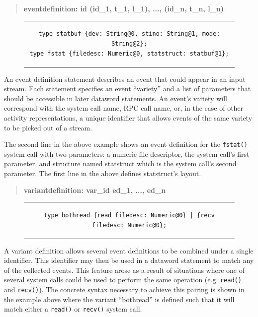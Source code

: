 \begin{quote}
\centering
\textbf{eventdefinition: id (id\_1, t\_1, l\_1), ..., (id\_n, t\_n, l\_n) }
\end{quote}

\begin{figure}[H]
\centering
\begin{tabular}{c}
\begin{lstlisting}
type statbuf {dev: String@0, stino: String@1, mode: String@2};
type fstat {filedesc: Numeric@0, statstruct: statbuf@1};
\end{lstlisting}
\end{tabular}
\end{figure}

An event definition statement describes an event that could appear in an input
stream.  Each statement specifies an event ``variety'' and a list of
parameters that should be accessible in later dataword statements.
An event's variety will correspond
with the system call name, RPC call name, or, in the case of other activity
representations, a unique identifier that allows events of the same
variety to be picked out of a stream.

The second line in the above example shows an event
definition for
the {\tt fstat()} system call
with two parameters:
a numeric file descriptor, the system call's first parameter,
and structure named statstruct
which is the system call's second parameter.
The first line in the above defines statstruct's layout.


\begin{quote}
\centering
\textbf{variantdefinition: var\_id ed\_1, ..., ed\_n}
\end{quote}

\begin{figure}[H]
\centering
\begin{tabular}{c}
\begin{lstlisting}
type bothread {read filedesc: Numeric@0} | {recv filedesc: Numeric@0};
\end{lstlisting}
\end{tabular}
\end{figure}

A variant definition allows several event definitions to be combined under
a single identifier.  This identifier may then be used in a dataword
statement to match any of the collected events.  This feature arose as a
result of situations where one of several system calls could be used to
perform the same operation (e.g. {\tt read()} and {\tt recv()}).  The
concrete syntax necessary to achieve this pairing is shown in the example
above where the variant ``bothread'' is defined such that it will match
either a {\tt read()} or {\tt recv()} system call.

